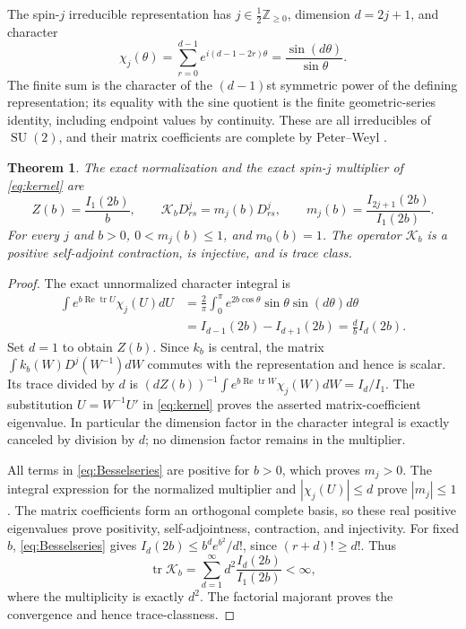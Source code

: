 \documentclass[11pt]{article}
\newtheorem{theorem}{Theorem}
\newcommand{\SU}{\operatorname{SU}}
\newcommand{\tr}{\operatorname{tr}}
\newcommand{\Rea}{\operatorname{Re}}
\begin{document}
The spin-$j$ irreducible representation has $j\in\frac12\mathbb Z_{\geq0}$,
dimension $d=2j+1$, and character
\[
 \chi_j(\theta)=\sum_{r=0}^{d-1}e^{i(d-1-2r)\theta}
 =\frac{\sin(d\theta)}{\sin\theta}.
\]
The finite sum is the character of the $(d-1)$st symmetric power of the
defining representation; its equality with the sine quotient is the
finite geometric-series identity, including endpoint values by
continuity. These are all irreducibles of $\SU(2)$, and their matrix
coefficients are complete by Peter--Weyl \cite{PeterWeyl}.

\begin{theorem}\label{thm:multiplier}
The exact normalization and the exact spin-$j$ multiplier of
\eqref{eq:kernel} are
\begin{equation}\label{eq:multiplier}
 Z(b)=\frac{I_1(2b)}b,\qquad
 \mathcal K_bD^j_{rs}=m_j(b)D^j_{rs},\qquad
 m_j(b)=\frac{I_{2j+1}(2b)}{I_1(2b)}.
\end{equation}
For every $j$ and $b>0$, $0<m_j(b)\leq1$, and $m_0(b)=1$.
The operator $\mathcal K_b$ is a positive self-adjoint contraction,
is injective, and is trace class.
\end{theorem}
\begin{proof}
The exact unnormalized character integral is
\begin{align*}
 \int e^{b\Rea\tr U}\chi_j(U)dU
 &=\frac2\pi\int_0^\pi e^{2b\cos\theta}
                      \sin\theta\sin(d\theta)d\theta\\
 &=I_{d-1}(2b)-I_{d+1}(2b)=\frac dbI_d(2b).
\end{align*}
Set $d=1$ to obtain $Z(b)$. Since $k_b$ is central, the matrix
$\int k_b(W)D^j(W^{-1})dW$ commutes with the representation and hence
is scalar. Its trace divided by $d$ is
$(dZ(b))^{-1}\int e^{b\Rea\tr W}\chi_j(W)dW=I_d/I_1$.
The substitution $U=W^{-1}U'$ in \eqref{eq:kernel} proves the asserted
matrix-coefficient eigenvalue. In particular the dimension factor in
the character integral is exactly canceled by division by $d$; no
dimension factor remains in the multiplier.

All terms in \eqref{eq:Besselseries} are positive for $b>0$, which
proves $m_j>0$. The integral expression for the normalized multiplier
and $|\chi_j(U)|\leq d$ prove $|m_j|\leq1$. The matrix coefficients
form an orthogonal complete basis, so these real positive eigenvalues
prove positivity, self-adjointness, contraction, and injectivity.
For fixed $b$, \eqref{eq:Besselseries} gives
$I_d(2b)\leq b^de^{b^2}/d!$, since $(r+d)!\geq d!$.
Thus
\[
 \tr\mathcal K_b=\sum_{d=1}^{\infty}d^2\frac{I_d(2b)}{I_1(2b)}<\infty,
\]
where the multiplicity is exactly $d^2$. The factorial majorant proves
the convergence and hence trace-classness.
\end{proof}
\end{document}
